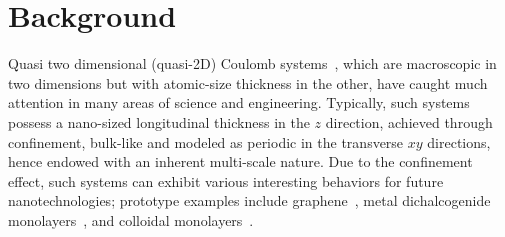 \section{Background}



Quasi two dimensional (quasi-2D) Coulomb systems~\cite{mazars2011long}, which are macroscopic in two dimensions but with atomic-size thickness in the other, have caught much attention in many areas of science and engineering. 
Typically, such systems possess a nano-sized longitudinal thickness in the $z$ direction, achieved through confinement, bulk-like and modeled as periodic in the transverse $xy$ directions, hence endowed with an  inherent multi-scale nature.
Due to the confinement effect, such systems can exhibit various interesting behaviors for future nanotechnologies;
prototype examples include graphene~\cite{novoselov2004electric}, metal dichalcogenide monolayers~\cite{kumar2012tunable}, and colloidal monolayers~\cite{mangold2003phase}.


